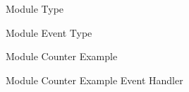 \begin{figure}
  \centering
  
  \caption{Module Type}
\end{figure}

\begin{figure}
  \centering
  
  \caption{Module Event Type}
\end{figure}

\begin{figure}
  \centering
  
  \caption{Module Counter Example}
\end{figure}

\begin{figure}
  \centering
  
  \caption{Module Counter Example Event Handler}
\end{figure}
